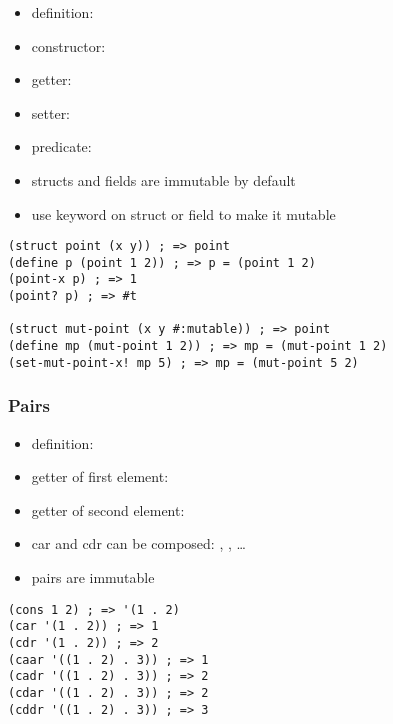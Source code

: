 \documentclass[a4paper,landscape,10pt]{article}
\begin{document}
\begin{multicols*}{2}
  \begin{itemize}
    \item definition: 
    \item constructor: 
    \item getter: 
    \item setter: 
    \item predicate: 
    \item structs and fields are immutable by default
    \item use  keyword on struct or field to make it mutable
  \end{itemize}

  \begin{lstlisting}[language=Racket]
(struct point (x y)) ; => point
(define p (point 1 2)) ; => p = (point 1 2)
(point-x p) ; => 1
(point? p) ; => #t

(struct mut-point (x y #:mutable)) ; => point
(define mp (mut-point 1 2)) ; => mp = (mut-point 1 2)
(set-mut-point-x! mp 5) ; => mp = (mut-point 5 2)
\end{lstlisting}

  \subsubsection{Pairs}

  \begin{itemize}
    \item definition: 
    \item getter of first element: 
    \item getter of second element: 
    \item car and cdr can be composed: , , \ldots
    \item pairs are immutable
  \end{itemize}

  \begin{lstlisting}[language=Racket]
(cons 1 2) ; => '(1 . 2)
(car '(1 . 2)) ; => 1
(cdr '(1 . 2)) ; => 2
(caar '((1 . 2) . 3)) ; => 1
(cadr '((1 . 2) . 3)) ; => 2
(cdar '((1 . 2) . 3)) ; => 2
(cddr '((1 . 2) . 3)) ; => 3
\end{lstlisting}

  \breakcolumn


\end{multicols*}
\end{document}
